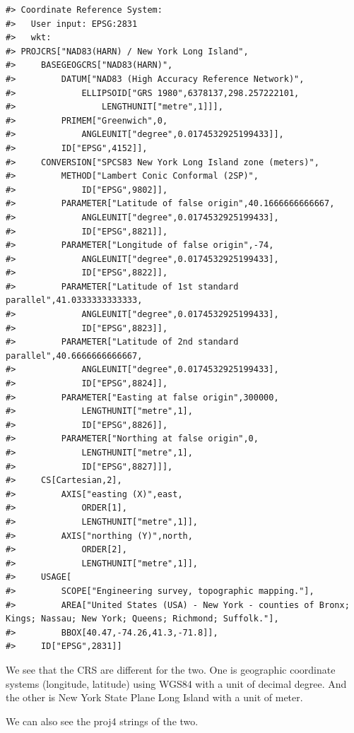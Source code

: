 \documentclass[
  11pt,
]{book}
\newenvironment{Shaded}{\begin{snugshade}}{\end{snugshade}}
\newcommand{\FunctionTok}[1]{\textcolor[rgb]{0.00,0.00,0.00}{#1}}
\newcommand{\NormalTok}[1]{#1}
\newcommand{\SpecialCharTok}[1]{\textcolor[rgb]{0.00,0.00,0.00}{#1}}
\begin{document}
\begin{verbatim}
#> Coordinate Reference System:
#>   User input: EPSG:2831 
#>   wkt:
#> PROJCRS["NAD83(HARN) / New York Long Island",
#>     BASEGEOGCRS["NAD83(HARN)",
#>         DATUM["NAD83 (High Accuracy Reference Network)",
#>             ELLIPSOID["GRS 1980",6378137,298.257222101,
#>                 LENGTHUNIT["metre",1]]],
#>         PRIMEM["Greenwich",0,
#>             ANGLEUNIT["degree",0.0174532925199433]],
#>         ID["EPSG",4152]],
#>     CONVERSION["SPCS83 New York Long Island zone (meters)",
#>         METHOD["Lambert Conic Conformal (2SP)",
#>             ID["EPSG",9802]],
#>         PARAMETER["Latitude of false origin",40.1666666666667,
#>             ANGLEUNIT["degree",0.0174532925199433],
#>             ID["EPSG",8821]],
#>         PARAMETER["Longitude of false origin",-74,
#>             ANGLEUNIT["degree",0.0174532925199433],
#>             ID["EPSG",8822]],
#>         PARAMETER["Latitude of 1st standard parallel",41.0333333333333,
#>             ANGLEUNIT["degree",0.0174532925199433],
#>             ID["EPSG",8823]],
#>         PARAMETER["Latitude of 2nd standard parallel",40.6666666666667,
#>             ANGLEUNIT["degree",0.0174532925199433],
#>             ID["EPSG",8824]],
#>         PARAMETER["Easting at false origin",300000,
#>             LENGTHUNIT["metre",1],
#>             ID["EPSG",8826]],
#>         PARAMETER["Northing at false origin",0,
#>             LENGTHUNIT["metre",1],
#>             ID["EPSG",8827]]],
#>     CS[Cartesian,2],
#>         AXIS["easting (X)",east,
#>             ORDER[1],
#>             LENGTHUNIT["metre",1]],
#>         AXIS["northing (Y)",north,
#>             ORDER[2],
#>             LENGTHUNIT["metre",1]],
#>     USAGE[
#>         SCOPE["Engineering survey, topographic mapping."],
#>         AREA["United States (USA) - New York - counties of Bronx; Kings; Nassau; New York; Queens; Richmond; Suffolk."],
#>         BBOX[40.47,-74.26,41.3,-71.8]],
#>     ID["EPSG",2831]]
\end{verbatim}

We see that the CRS are different for the two. One is geographic coordinate systems (longitude, latitude) using WGS84 with a unit of decimal degree. And the other is New York State Plane Long Island with a unit of meter.

We can also see the proj4 strings of the two.

\begin{Shaded}
\end{Shaded}
\end{document}
